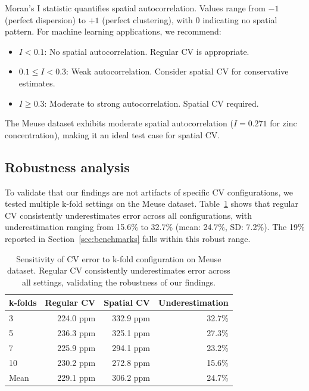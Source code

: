 \documentclass[article]{jss}
\begin{document}
Moran's I statistic \citep{moran1950notes} quantifies spatial autocorrelation. Values range from $-1$ (perfect dispersion) to $+1$ (perfect clustering), with $0$ indicating no spatial pattern. For machine learning applications, we recommend:

\begin{itemize}
\item $I < 0.1$: No spatial autocorrelation. Regular CV is appropriate.
\item $0.1 \leq I < 0.3$: Weak autocorrelation. Consider spatial CV for conservative estimates.
\item $I \geq 0.3$: Moderate to strong autocorrelation. Spatial CV required.
\end{itemize}

The Meuse dataset exhibits moderate spatial autocorrelation ($I = 0.271$ for zinc concentration), making it an ideal test case for spatial CV.

\subsection{Robustness analysis}

To validate that our findings are not artifacts of specific CV configurations, we tested multiple k-fold settings on the Meuse dataset. Table~\ref{tab:sensitivity} shows that regular CV consistently underestimates error across all configurations, with underestimation ranging from 15.6\% to 32.7\% (mean: 24.7\%, SD: 7.2\%). The 19\% reported in Section~\ref{sec:benchmarks} falls within this robust range.

\begin{table}[ht]
\centering
\begin{tabular}{lrrr}
\toprule
k-folds & Regular CV & Spatial CV & Underestimation \\
\midrule
3  & 224.0 ppm & 332.9 ppm & 32.7\% \\
5  & 236.3 ppm & 325.1 ppm & 27.3\% \\
7  & 225.9 ppm & 294.1 ppm & 23.2\% \\
10 & 230.2 ppm & 272.8 ppm & 15.6\% \\
\midrule
Mean & 229.1 ppm & 306.2 ppm & 24.7\% \\
\bottomrule
\end{tabular}
\caption{Sensitivity of CV error to k-fold configuration on Meuse dataset. Regular CV consistently underestimates error across all settings, validating the robustness of our findings.}
\label{tab:sensitivity}
\end{table}
\end{document}
